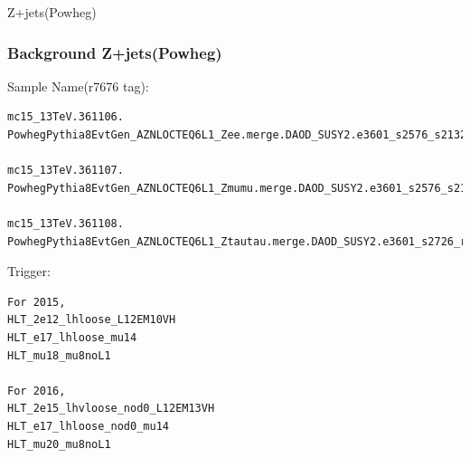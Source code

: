 \documentclass[mathserif,serif]{beamer}
\begin{document}
\begin{frame}
\begin{center}
\huge
Z+jets(Powheg)
\end{center}
\end{frame}

\begin{frame}[fragile]
\frametitle{Background Z+jets(Powheg)}
\small
Sample Name(r7676 tag):
\tiny
\begin{verbatim}
mc15_13TeV.361106.
PowhegPythia8EvtGen_AZNLOCTEQ6L1_Zee.merge.DAOD_SUSY2.e3601_s2576_s2132_r7725_r7676_p2666/

mc15_13TeV.361107.
PowhegPythia8EvtGen_AZNLOCTEQ6L1_Zmumu.merge.DAOD_SUSY2.e3601_s2576_s2132_r7725_r7676_p2669/

mc15_13TeV.361108.
PowhegPythia8EvtGen_AZNLOCTEQ6L1_Ztautau.merge.DAOD_SUSY2.e3601_s2726_r7772_r7676_p2666/
\end{verbatim}
\end{frame}

\begin{frame}[fragile]
\small
Trigger:\\
\scriptsize
\begin{verbatim}
For 2015,
HLT_2e12_lhloose_L12EM10VH
HLT_e17_lhloose_mu14
HLT_mu18_mu8noL1

For 2016,
HLT_2e15_lhvloose_nod0_L12EM13VH
HLT_e17_lhloose_nod0_mu14
HLT_mu20_mu8noL1
\end{verbatim}
\end{frame}
\end{document}
